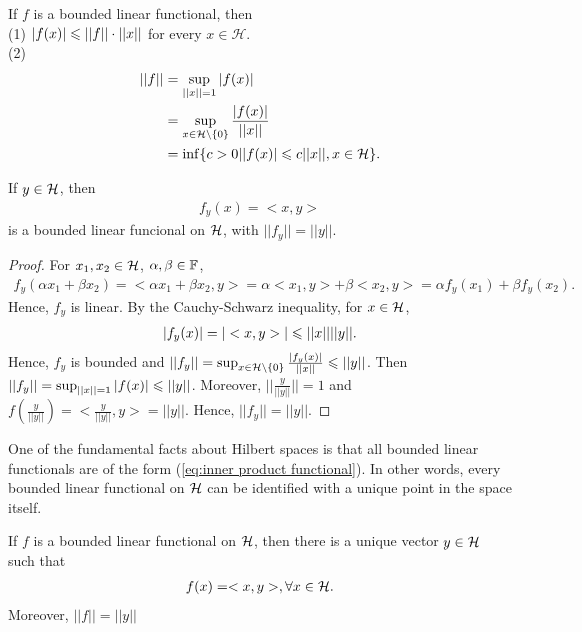 \begin{proposition}{}{}
    If $f$ is a bounded linear functional, then\\
    (1) $|f(x)|\leqslant ||f||\cdot ||x||$ for every $x\in \mathcal{H}$.\\
    (2) \begin{align*}
        ||f|| &= \sup_{||x||=1}|f(x)|\\
              &= \sup_{x\in \mathcal{H} \setminus\{0\}} \frac{|f(x)|}{||x||}\\
              &= \inf\{c>0||f(x)|\leqslant c||x||,x\in \mathcal{H}\}. 
    \end{align*}
\end{proposition}

\begin{proposition}{}{}
    If $y\in \mathcal{H}$, then 
    \begin{align}
        f_y(x)=<x,y>
        \label{eq:inner product functional}
    \end{align} 
    is a bounded linear funcional on $\mathcal{H}$, with $||f_y||=||y||$.
\end{proposition}
\begin{proof}
    For $x_1,x_2\in\mathcal{H}$, $\alpha,\beta\in\mathbb{F}$, 
    \begin{align*}
        f_y(\alpha x_1+\beta x_2)=<\alpha x_1+\beta x_2,y>= \alpha<x_1,y>+\beta<x_2,y>=\alpha f_y(x_1)+\beta f_y(x_2).
    \end{align*}
    Hence, $f_y$ is linear. 
    By the Cauchy-Schwarz inequality, for $x\in\mathcal{H}$,
    \begin{align*}
        |f_y(x)|=|<x,y>|\leqslant ||x||||y||. 
    \end{align*}
    Hence, $f_y$ is bounded and $||f_y||=\sup_{x\in \mathcal{H} \setminus\{0\}} \frac{|f_y(x)|}{||x||}\leqslant ||y||$. Then $||f_y|| = \sup_{||x||=1}|f(x)|\leqslant ||y||$. 
    Moreover, $||\frac{y}{||y||}||=1$ and $f(\frac{y}{||y||})=<\frac{y}{||y||},y>=||y||$. Hence, $||f_y||=||y||$. 
\end{proof}

One of the fundamental facts about Hilbert spaces is that all bounded linear
functionals are of the form (\ref{eq:inner product functional}). In other words, 
every bounded linear functional on $\mathcal{H}$ can be identified with a unique point in the space itself.

\begin{theorem}{}{}
    If $f$ is a bounded linear functional on $\mathcal{H}$, then there is a unique vector $y\in\mathcal{H}$ such that
    \begin{align}
        f(x) = <x,y>, \forall x\in \mathcal{H}.
    \end{align}
    Moreover, $||f||=||y||$
\end{theorem}

